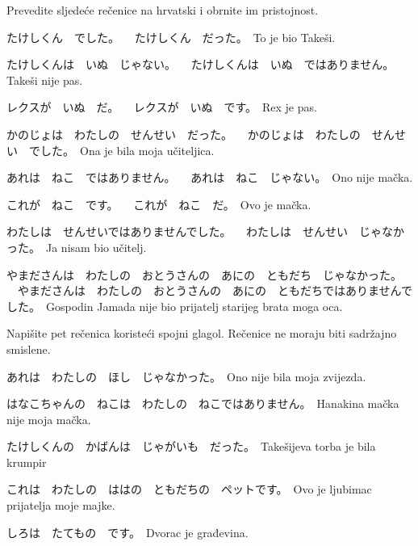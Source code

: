 
\author{Katja Kržišnik}

	
	\begin{mondai}{Prevedite sljedeće rečenice na hrvatski i obrnite im pristojnost.}
		\item たけしくん　でした。 \newline　{たけしくん　だった。}　{To je bio Takeši.}
		\item たけしくんは　いぬ　じゃない。 \newline　たけしくんは　いぬ　ではありません。　{Takeši nije pas.}
		\item レクスが　いぬ　だ。 \newline　レクスが　いぬ　です。　{Rex je pas.}
		\item かのじょは　わたしの　せんせい　だった。 \newline　かのじょは　わたしの　せんせい　でした。　{Ona je bila moja učiteljica.}
		\item あれは　ねこ　ではありません。 \newline　あれは　ねこ　じゃない。　{Ono nije mačka.}
		\item これが　ねこ　です。 \newline　これが　ねこ　だ。　{Ovo je mačka.}
		\item わたしは　せんせいではありませんでした。 \newline　わたしは　せんせい　じゃなかった。　{Ja nisam bio učitelj.}　
		\item やまださんは　わたしの　おとうさんの　あにの　ともだち　じゃなかった。 \newline　やまださんは　わたしの　おとうさんの　あにの　ともだちではありませんでした。　{Gospodin Jamada nije bio prijatelj starijeg brata moga oca.}
	\end{mondai}
	
		
	\begin{mondai}{Napišite pet rečenica koristeći spojni glagol. Rečenice ne moraju biti sadržajno smislene.}
		\item {あれは　わたしの　ほし　じゃなかった。}　{Ono nije bila moja zvijezda.}
		\item {はなこちゃんの　ねこは　わたしの　ねこではありません。}　{Hanakina mačka nije moja mačka.}
		\item {たけしくんの　かばんは　じゃがいも　だった。}　{Takešijeva torba je bila krumpir}
		\item {これは　わたしの　ははの　ともだちの　ペットです。}　{Ovo je ljubimac prijatelja moje majke.}
		\item {しろは　たてもの　です。}　{Dvorac je građevina.}
	\end{mondai}
	
	
